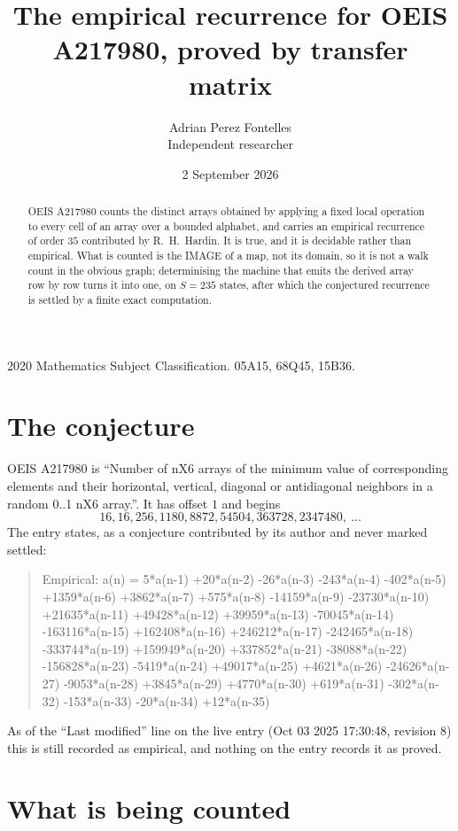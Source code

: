 \documentclass[11pt,a4paper]{article}
\title{The empirical recurrence for OEIS A217980, proved by transfer matrix}
\author{Adrian Perez Fontelles\\ \small Independent researcher}
\date{2 September 2026}
\theoremstyle{plain}
\theoremstyle{definition}
\begin{document}
\maketitle

\begin{abstract}
OEIS A217980 counts the distinct arrays obtained by applying a fixed local operation to every cell
of an array over a bounded alphabet, and carries an empirical recurrence of order $35$
contributed by R.~H.~Hardin. It is true, and it is decidable rather than empirical. What is
counted is the IMAGE of a map, not its domain, so it is not a walk count in the obvious graph;
determinising the machine that emits the derived array row by row turns it into one, on
$S=235$ states, after which the conjectured recurrence is settled by a finite exact
computation.
\end{abstract}

\noindent\small 2020 Mathematics Subject Classification. 05A15, 68Q45, 15B36.\normalsize

\section{The conjecture}

OEIS A217980 is ``Number of nX6 arrays of the minimum value of corresponding elements and their horizontal, vertical, diagonal or antidiagonal neighbors in a random 0..1 nX6 array.''. It has offset $1$ and begins
\[
16, 16, 256, 1180, 8872, 54504, 363728, 2347480,\ \dots
\]
The entry states, as a conjecture contributed by its author and never marked settled:
\begin{quote}
Empirical: a(n) = 5*a(n-1) +20*a(n-2) -26*a(n-3) -243*a(n-4) -402*a(n-5) +1359*a(n-6) +3862*a(n-7) +575*a(n-8) -14159*a(n-9) -23730*a(n-10) +21635*a(n-11) +49428*a(n-12) +39959*a(n-13) -70045*a(n-14) -163116*a(n-15) +162408*a(n-16) +246212*a(n-17) -242465*a(n-18) -333744*a(n-19) +159949*a(n-20) +337852*a(n-21) -38088*a(n-22) -156828*a(n-23) -5419*a(n-24) +49017*a(n-25) +4621*a(n-26) -24626*a(n-27) -9053*a(n-28) +3845*a(n-29) +4770*a(n-30) +619*a(n-31) -302*a(n-32) -153*a(n-33) -20*a(n-34) +12*a(n-35)
\end{quote}
As of the ``Last modified'' line on the live entry (Oct 03 2025 17:30:48, revision 8) this is still
recorded as empirical, and nothing on the entry records it as proved.

\section{What is being counted}
\end{document}
